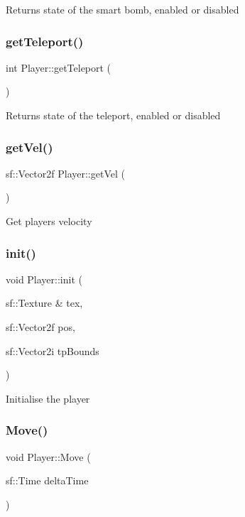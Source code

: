 Returns state of the smart bomb, enabled or disabled \mbox{\label{class_player_a995b03fe2b8f0b47aa526c975a3b8254}} 
\subsubsection{\texorpdfstring{get\+Teleport()}{getTeleport()}}
{\footnotesize\ttfamily int Player\+::get\+Teleport (\begin{DoxyParamCaption}{ }\end{DoxyParamCaption})}

Returns state of the teleport, enabled or disabled \mbox{\label{class_player_a0ec9b337a29a388ca7ce6dc9de93ca76}} 
\subsubsection{\texorpdfstring{get\+Vel()}{getVel()}}
{\footnotesize\ttfamily sf\+::\+Vector2f Player\+::get\+Vel (\begin{DoxyParamCaption}{ }\end{DoxyParamCaption})}

Get player\textquotesingle{}s velocity \mbox{\label{class_player_ad088063876ac0e5c3eb59fc7c4806929}} 
\subsubsection{\texorpdfstring{init()}{init()}}
{\footnotesize\ttfamily void Player\+::init (\begin{DoxyParamCaption}\item[{sf\+::\+Texture \&}]{tex,  }\item[{sf\+::\+Vector2f}]{pos,  }\item[{sf\+::\+Vector2i}]{tp\+Bounds }\end{DoxyParamCaption})}

Initialise the player \mbox{\label{class_player_aab4ff61041f937e6c3d560863fa46f56}} 
\subsubsection{\texorpdfstring{Move()}{Move()}}
{\footnotesize\ttfamily void Player\+::\+Move (\begin{DoxyParamCaption}\item[{sf\+::\+Time}]{delta\+Time }\end{DoxyParamCaption})}

